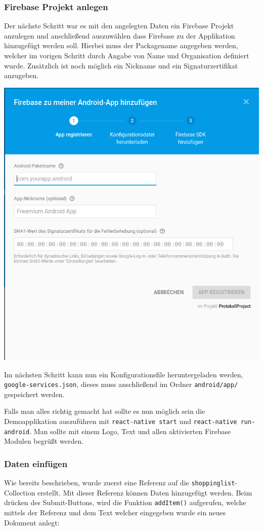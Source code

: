 \subsubsection{Firebase Projekt anlegen}
Der nächste Schritt war es mit den angelegten Daten ein Firebase Projekt anzulegen und anschließend auszuwählen dass Firebase zu der Applikation hinzugefügt werden soll. Hierbei muss der Packagename angegeben werden, welcher im vorigen Schritt durch Angabe von Name und Organisation definiert wurde. Zusätzlich ist noch möglich ein Nickname und ein Signaturzertifikat anzugeben. 

\begin{minipage}{\linewidth}
	\centering
	\includegraphics[width=0.7\linewidth]{images/2}
\end{minipage}
Im nächsten Schritt kann nun ein Konfigurationsfile heruntergeladen werden, \verb|google-services.json|, dieses muss anschließend im Ordner \verb|android/app/| gespeichert werden. 

Falls man alles richtig gemacht hat sollte es nun möglich sein die Demoapplikation auszuführen mit \verb|react-native start| und \verb|react-native run-android|. Man sollte mit einem Logo, Text und allen aktivierten Firebase Modulen begrüßt werden.
\subsubsection{Daten einfügen}
Wie bereits beschrieben, wurde zuerst eine Referenz auf die \verb|shoppinglist|-Collection erstellt. Mit dieser Referenz können Daten hinzugefügt werden. Beim drücken des Submit-Buttons, wird die Funktion \verb|addItem()| aufgerufen, welche mittels der Referenz und dem Text welcher eingegeben wurde ein neues Dokument anlegt:


